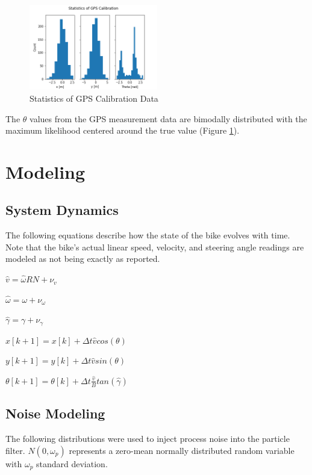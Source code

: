 \documentclass[twoside,twocolumn]{article}
\begin{document}
\begin{figure}[h]
\caption{Statistics of GPS Calibration Data}
\label{fig:hist}
\centering
\includegraphics[width=0.5\textwidth]{hist.png}
\end{figure}

The $\theta$ values from the GPS measurement data are bimodally distributed with the maximum likelihood centered around the true value (Figure \ref{fig:hist}).

\section{Modeling}

\subsection{System Dynamics}
The following equations describe how the state of the bike evolves with time. Note that the bike's actual linear speed, velocity, and steering angle readings are modeled as not being exactly as reported.

\begin{center}
$\hat{v} =  \hat{\omega} R N + \nu_v$

$\hat{\omega} = \omega + \nu_\omega$

$\hat{\gamma} = \gamma + \nu_\gamma$

$x[k+1] = x[k] + \Delta t \hat{v}cos(\theta)$

$y[k+1] = y[k]  + \Delta t \hat{v} sin(\theta)$

$\theta[k+1] = \theta[k] + \Delta t \frac{\hat{v}}{B} tan(\hat{\gamma})$
\end{center}

\subsection{Noise Modeling}

The following distributions were used to inject process noise into the particle filter.
$N(0,\omega_p)$ represents a zero-mean normally distributed random variable with $\omega_p$ standard deviation.
\end{document}

